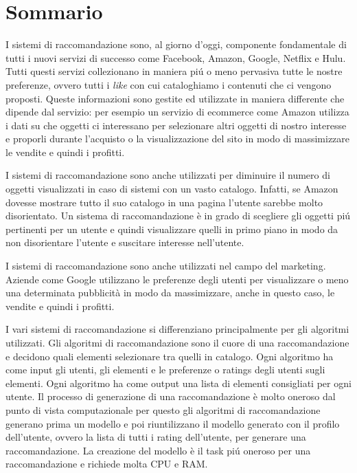 \chapter*{Sommario}

I sistemi di raccomandazione sono, al giorno d'oggi, componente fondamentale di tutti i nuovi servizi di successo come Facebook, Amazon, Google, Netflix e Hulu. Tutti questi servizi collezionano in maniera pi\'u o meno pervasiva tutte le nostre preferenze, ovvero tutti i \textit{like} con cui cataloghiamo i contenuti che ci vengono proposti. Queste informazioni sono gestite ed utilizzate in maniera differente che dipende dal servizio: per esempio un servizio di ecommerce come Amazon utilizza i dati su che oggetti ci interessano per selezionare altri oggetti di nostro interesse e proporli durante l'acquisto o la visualizzazione del sito in modo di massimizzare le vendite e quindi i profitti.

I sistemi di raccomandazione sono anche utilizzati per diminuire il numero di oggetti visualizzati in caso di sistemi con un vasto catalogo. Infatti, se Amazon dovesse mostrare tutto il suo catalogo in una pagina l'utente sarebbe molto disorientato. Un sistema di raccomandazione \`e in grado di scegliere gli oggetti pi\'u pertinenti per un utente e quindi visualizzare quelli in primo piano in modo da non disorientare l'utente e suscitare interesse nell'utente.

I sistemi di raccomandazione sono anche utilizzati nel campo del marketing. Aziende come Google utilizzano le preferenze degli utenti per visualizzare o meno una determinata pubblicit\`a in modo da massimizzare, anche in questo caso, le vendite e quindi i profitti.

I vari sistemi di raccomandazione si differenziano principalmente per gli algoritmi utilizzati. Gli algoritmi di raccomandazione sono il cuore di una raccomandazione e decidono quali elementi selezionare tra quelli in catalogo. Ogni algoritmo ha come input gli utenti, gli elementi e le preferenze o ratings degli utenti sugli elementi. Ogni algoritmo ha come output una lista di elementi consigliati per ogni utente. Il processo di generazione di una raccomandazione \`e molto oneroso dal punto di vista computazionale per questo gli algoritmi di raccomandazione generano prima un modello e poi riuntilizzano il modello generato con il profilo dell'utente, ovvero la lista di tutti i rating dell'utente, per generare una raccomandazione. La creazione del modello \`e il task pi\'u oneroso per una raccomandazione e richiede molta \ac{CPU} e \ac{RAM}.

